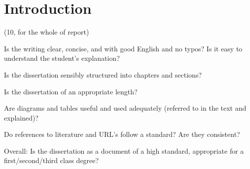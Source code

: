 \section{Introduction}
\label{sec:intro}

(10, for the whole of report)

Is the writing clear, concise, and with good English and no typos? Is it easy
to understand the student’s explanation?

Is the dissertation sensibly structured into chapters and sections?

Is the dissertation of an appropriate length?

Are diagrams and tables useful and used adequately (referred to in the text and
explained)?

Do references to literature and URL’s follow a standard? Are they consistent?

Overall: Is the dissertation as a document of a high standard, appropriate for
a first/second/third class degree?




